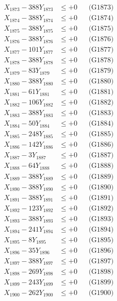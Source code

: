 \documentclass[a4paper,10pt]{article}
\begin{document}
{\begin{align}
X_{1873} - 388Y_{1873} &\leq +0 && \text{(G1873)} \\
X_{1874} - 388Y_{1874} &\leq +0 && \text{(G1874)} \\
X_{1875} - 388Y_{1875} &\leq +0 && \text{(G1875)} \\
X_{1876} - 388Y_{1876} &\leq +0 && \text{(G1876)} \\
X_{1877} - 101Y_{1877} &\leq +0 && \text{(G1877)} \\
X_{1878} - 388Y_{1878} &\leq +0 && \text{(G1878)} \\
X_{1879} - 83Y_{1879} &\leq +0 && \text{(G1879)} \\
X_{1880} - 388Y_{1880} &\leq +0 && \text{(G1880)} \\
\allowbreak
X_{1881} - 61Y_{1881} &\leq +0 && \text{(G1881)} \\
X_{1882} - 106Y_{1882} &\leq +0 && \text{(G1882)} \\
X_{1883} - 388Y_{1883} &\leq +0 && \text{(G1883)} \\
X_{1884} - 50Y_{1884} &\leq +0 && \text{(G1884)} \\
X_{1885} - 248Y_{1885} &\leq +0 && \text{(G1885)} \\
X_{1886} - 142Y_{1886} &\leq +0 && \text{(G1886)} \\
X_{1887} - 3Y_{1887} &\leq +0 && \text{(G1887)} \\
X_{1888} - 64Y_{1888} &\leq +0 && \text{(G1888)} \\
X_{1889} - 388Y_{1889} &\leq +0 && \text{(G1889)} \\
X_{1890} - 388Y_{1890} &\leq +0 && \text{(G1890)} \\
\allowbreak
X_{1891} - 388Y_{1891} &\leq +0 && \text{(G1891)} \\
X_{1892} - 123Y_{1892} &\leq +0 && \text{(G1892)} \\
X_{1893} - 388Y_{1893} &\leq +0 && \text{(G1893)} \\
X_{1894} - 241Y_{1894} &\leq +0 && \text{(G1894)} \\
X_{1895} - 8Y_{1895} &\leq +0 && \text{(G1895)} \\
X_{1896} - 35Y_{1896} &\leq +0 && \text{(G1896)} \\
X_{1897} - 388Y_{1897} &\leq +0 && \text{(G1897)} \\
X_{1898} - 269Y_{1898} &\leq +0 && \text{(G1898)} \\
X_{1899} - 243Y_{1899} &\leq +0 && \text{(G1899)} \\
X_{1900} - 262Y_{1900} &\leq +0 && \text{(G1900)} \\

\end{align}}
\end{document}
